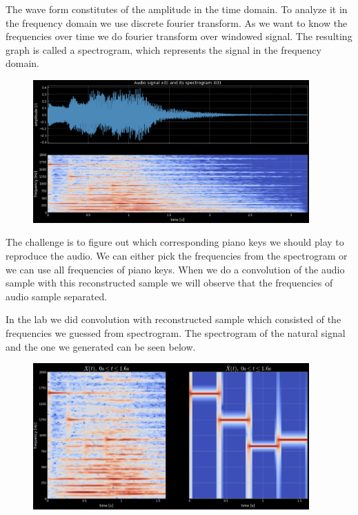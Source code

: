 The wave form constitutes of the amplitude  in the time domain. To analyze it in the frequency domain we use discrete fourier transform. As we want to know the frequencies over time we do fourier transform over windowed signal. The resulting graph is called a spectrogram, which represents the signal in the frequency domain.

\begin{figure}[ht]
    \centering
    \includegraphics[width=300pt]{figs/2.png}
    \label{fig:spectrogram}
\end{figure}

The challenge is to figure out which corresponding piano keys we should play to reproduce the audio. We can either pick the frequencies from the spectrogram or we can use all frequencies of piano keys. When we do a convolution of the audio sample with this reconstructed sample we will observe that the frequencies of audio sample separated. 

In the lab we did convolution with reconstructed sample which consisted of the frequencies we guessed from spectrogram. The spectrogram of the natural signal and the one we generated can be seen below.
\begin{figure}[ht]
    \centering
    \includegraphics[width=300pt]{figs/3.png}
    \label{fig:spectrograms of original and reconstruction}
\end{figure}
